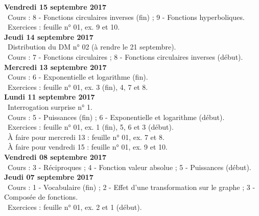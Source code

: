 \documentclass[12pt,a4paper]{article}
\begin{document}
\noindent\textbf{Vendredi 15 septembre 2017}\\
\bu\ Cours : 8 - Fonctions circulaires inverses (fin) ; 9 - Fonctions hyperboliques.\\
\bu\ Exercices : feuille n° 01, ex. 9 et 10.\vspace{.4cm}\\

\noindent\textbf{\bf Jeudi 14 septembre 2017}\\
\bu\ Distribution du DM n° 02 (à rendre le 21 septembre).\\
\bu\ Cours : 7 - Fonctions circulaires ; 8 - Fonctions circulaires inverses (début).\vspace{.4cm}\\

\noindent\textbf{\bf Mercredi 13 septembre 2017}\\
\bu\ Cours : 6 - Exponentielle et logarithme (fin).\\
\bu\ Exercices : feuille n° 01, ex. 3 (fin), 4, 7 et 8.\vspace{.4cm}\\

\noindent\textbf{\bf Lundi 11 septembre 2017}\\
\bu\ Interrogation surprise n° 1.\\
\bu\ Cours : 5 - Puissances (fin) ; 6 - Exponentielle et logarithme (début).\\
\bu\ Exercices : feuille n° 01, ex. 1 (fin), 5, 6 et 3 (début).\\
\bu\ À faire pour mercredi 13 : feuille n° 01, ex. 7 et 8.\\
\bu\ À faire pour vendredi 15 : feuille n° 01, ex. 9 et 10.\vspace{.4cm}\\

\noindent\textbf{Vendredi 08 septembre 2017}\\
\bu\ Cours : 3 - Réciproques ; 4 - Fonction valeur absolue ; 5 - Puissances (début).\vspace{.4cm}\\

\noindent\textbf{\bf Jeudi 07 septembre 2017}\\
\bu\ Cours : 1 - Vocabulaire (fin) ; 2 - Effet d'une transformation sur le graphe ; 3 - Composée de fonctions.\\
\bu\ Exercices : feuille n° 01, ex. 2 et 1 (début).\vspace{.4cm}\\
   
\end{document}
